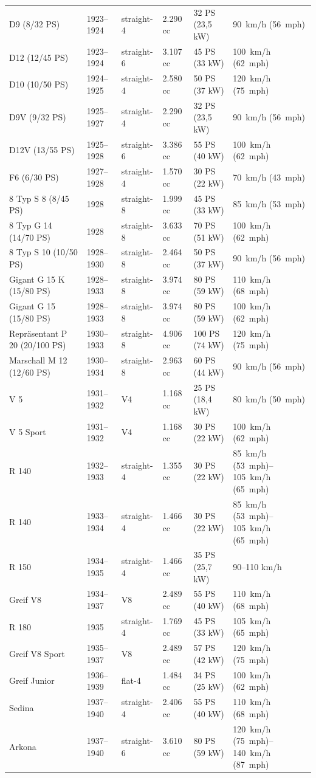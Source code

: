 \documentclass{article}
\begin{document}
\begin{tabular}{llllll}
D9 (8/32 PS) & 1923–1924 & straight-4 & 2.290 cc & 32 PS (23,5 kW) & 90 km/h (56 mph) \\
D12 (12/45 PS) & 1923–1924 & straight-6 & 3.107 cc & 45 PS (33 kW) & 100 km/h (62 mph) \\
D10 (10/50 PS) & 1924–1925 & straight-4 & 2.580 cc & 50 PS (37 kW) & 120 km/h (75 mph) \\
D9V (9/32 PS) & 1925–1927 & straight-4 & 2.290 cc & 32 PS (23,5 kW) & 90 km/h (56 mph) \\
D12V (13/55 PS) & 1925–1928 & straight-6 & 3.386 cc & 55 PS (40 kW) & 100 km/h (62 mph) \\
F6 (6/30 PS) & 1927–1928 & straight-4 & 1.570 cc & 30 PS (22 kW) & 70 km/h (43 mph) \\
8 Typ S 8 (8/45 PS) & 1928 & straight-8 & 1.999 cc & 45 PS (33 kW) & 85 km/h (53 mph) \\
8 Typ G 14 (14/70 PS) & 1928 & straight-8 & 3.633 cc & 70 PS (51 kW) & 100 km/h (62 mph) \\
8 Typ S 10 (10/50 PS) & 1928–1930 & straight-8 & 2.464 cc & 50 PS (37 kW) & 90 km/h (56 mph) \\
Gigant G 15 K (15/80 PS) & 1928–1933 & straight-8 & 3.974 cc & 80 PS (59 kW) & 110 km/h (68 mph) \\
Gigant G 15 (15/80 PS) & 1928–1933 & straight-8 & 3.974 cc & 80 PS (59 kW) & 100 km/h (62 mph) \\
Repräsentant P 20 (20/100 PS) & 1930–1933 & straight-8 & 4.906 cc & 100 PS (74 kW) & 120 km/h (75 mph) \\
Marschall M 12 (12/60 PS) & 1930–1934 & straight-8 & 2.963 cc & 60 PS (44 kW) & 90 km/h (56 mph) \\
V 5 & 1931–1932 & V4 & 1.168 cc & 25 PS (18,4 kW) & 80 km/h (50 mph) \\
V 5 Sport & 1931–1932 & V4 & 1.168 cc & 30 PS (22 kW) & 100 km/h (62 mph) \\
R 140 & 1932–1933 & straight-4 & 1.355 cc & 30 PS (22 kW) & 85 km/h (53 mph)–105 km/h (65 mph) \\
R 140 & 1933–1934 & straight-4 & 1.466 cc & 30 PS (22 kW) & 85 km/h (53 mph)–105 km/h (65 mph) \\
R 150 & 1934–1935 & straight-4 & 1.466 cc & 35 PS (25,7 kW) & 90–110 km/h \\
Greif V8 & 1934–1937 & V8 & 2.489 cc & 55 PS (40 kW) & 110 km/h (68 mph) \\
R 180 & 1935 & straight-4 & 1.769 cc & 45 PS (33 kW) & 105 km/h (65 mph) \\
Greif V8 Sport & 1935–1937 & V8 & 2.489 cc & 57 PS (42 kW) & 120 km/h (75 mph) \\
Greif Junior & 1936–1939 & flat-4 & 1.484 cc & 34 PS (25 kW) & 100 km/h (62 mph) \\
Sedina & 1937–1940 & straight-4 & 2.406 cc & 55 PS (40 kW) & 110 km/h (68 mph) \\
Arkona & 1937–1940 & straight-6 & 3.610 cc & 80 PS (59 kW) & 120 km/h (75 mph)–140 km/h (87 mph) \\
\bottomrule
\end{tabular}
\end{document}
